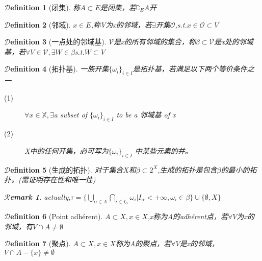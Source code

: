 \documentclass[hyperfer,UTF8,a4paper,12pt]{article}
\theoremstyle{plain}
\newtheorem*{Remark}{$\mathcal{R}$emark}
\newtheorem{Def}{{$\mathcal{D}$efinition}}[section]
\begin{document}
\begin{Def}[闭集]
	称$A\subset E $是闭集，若$ \complement_{E}A $开
\end{Def}

\begin{Def}[邻域]
	$ x\in E $,称V为x的邻域，若$ \exists $开集$ \mathcal{O} $,s.t.$ x\in\mathcal{O}\subset V $
\end{Def}

\begin{Def}[一点处的邻域基]
	$ \mathcal{V} $是x的所有邻域的集合，称$ \beta\subset\mathcal{V} $是x处的邻域基，若$ \forall V\in\mathcal{V},\exists W\in\beta $s.t.$ W\subset V $
\end{Def}

\begin{Def}[拓扑基]
	一族开集$ \{ \omega_i \}_{i\in I} $是拓扑基，若满足以下两个等价条件之一
	\begin{description}
		\item[(1)] $\forall x\in\mathbb{X},\exists $a subset of $ \{ \omega_i \}_{i\in I}$ to be a 邻域基 of x
		
		\item[(2)]  X中的任何开集，必可写为$ \{ \omega_i \}_{i\in I}$ 中某些元素的并。
	\end{description}
\end{Def}

\begin{Def}[生成的拓扑]
	对于集合$ X $和$ \beta\subset 2^X $,生成的拓扑是包含$ \beta $的最小的拓扑。(需证明存在性和唯一性)
	\begin{Remark}
		actually,$ \tau=\{ \bigcup\limits_{\alpha\in\Lambda}\bigcap\limits_{i\in I_\alpha}\omega_i|I_\alpha<+\infty,\omega_i\in\beta \}\cup\{ \emptyset,X \} $
	\end{Remark}
\end{Def}

\begin{Def}[Point adhérent]
	$ A\subset X,x\in X $,x称为A的adhérent点，若$ \forall V $为x的邻域，有$ V\cap A\not=\emptyset $
\end{Def}

\begin{Def}[聚点]
	$ A\subset X,x\in X $称为A的聚点，若$ \forall V $是x的邻域，$ V\cap A-\{x\}\not=\emptyset $
\end{Def}
\end{document}
